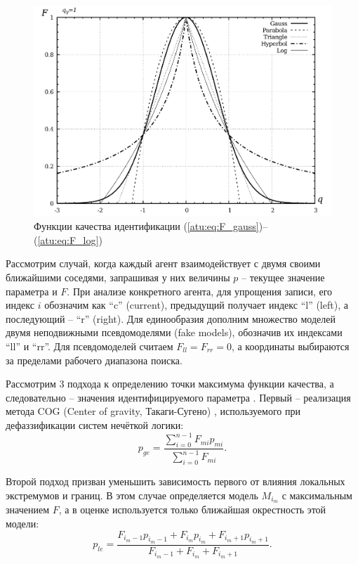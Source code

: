 \documentclass[a4paper,paratype,14pt,fouriernc]{dissatu}
\begin{document}
\begin{figure}[htb!]
  \centerline{\includegraphics[width=45\TW]{p/F_types.png} }
  \caption{Функции качества идентификации (\ref{atu:eq:F_gauss})--(\ref{atu:eq:F_log})}
  \label{atu:f:F_types}
\end{figure}

Рассмотрим случай, когда каждый агент взаимодействует с двумя своими ближайшими соседями,
запрашивая у них величины $p$ -- текущее значение параметра и $F$.
При анализе конкретного агента, для упрощения записи, его индекс $i$ обозначим как ``c'' (current),
предыдущий получает индекс ``l'' (left), а последующий -- ``r'' (right).
Для единообразия дополним множество моделей двумя неподвижными псевдомоделями (fake models),
обозначив их индексами ``ll'' и ``rr''. Для псевдомоделей считаем $  F_{ll} = F_{rr} = 0$,
а координаты выбираются за пределами рабочего диапазона поиска.


Рассмотрим 3 подхода к определению
точки максимума функции качества, а следовательно -- значения идентифицируемого параметра \cite{atu_st99,atu_jacs2015}.
Первый -- реализация
метода COG (Center of gravity, Такаги-Сугено) \cite{atu_asau25,atu_csit2015},
используемого при дефаззификации систем нечёткой логики:
%
\begin{equation}
  p_{ge}
  =
  \frac{\sum\limits_{i=0}^{n-1} F_{mi} p_{mi}}
       {\sum\limits_{i=0}^{n-1} F_{mi} }
  .
  \label{atu:eq:p_ge}
\end{equation}

Второй подход призван уменьшить зависимость первого
от влияния локальных экстремумов и границ. В этом
случае определяется модель $M_{i_{m}}$ с максимальным значением
$F$, а в оценке используется только ближайшая окрестность этой модели:
%
\begin{equation}
  p_{le}
  =
  \frac{ F_{i_m-1} p_{i_m-1} + F_{i_m} p_{i_m} + F_{i_m+1} p_{i_m+1} }
       { F_{i_m-1} + F_{i_m} + F_{i_m+1} }
  .
  \label{atu:eq:p_le}
\end{equation}
\end{document}
